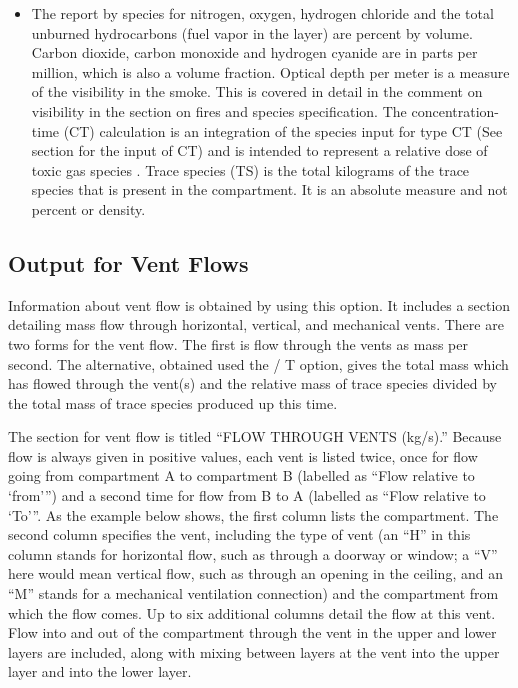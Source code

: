 \begin{itemize}
\item The report by species for nitrogen, oxygen, hydrogen chloride and the total unburned hydrocarbons (fuel vapor in the layer) are percent by volume. Carbon dioxide, carbon monoxide and hydrogen cyanide are in parts per million, which is also a volume fraction.  Optical depth per meter is a measure of the visibility in the smoke. This is covered in detail in the comment on visibility in the section on fires and species specification. The concentration-time (CT) calculation is an integration of the species input for type CT (See section  for the input of CT) and is intended to represent a relative dose of toxic gas species . Trace species (TS) is the total kilograms of the trace species that is present in the compartment. It is an absolute measure and not percent or density.
\end{itemize}

\subsection{Output for Vent Flows}

Information about vent flow is obtained by using this option.  It includes a section detailing mass flow through horizontal, vertical, and mechanical vents. There are two forms for the vent flow. The first is flow through the vents as mass per second. The alternative, obtained used the / T option, gives the total mass which has flowed through the vent(s) and the relative mass of trace species divided by the total mass of trace species produced up this time.

The section for vent flow is titled ``FLOW THROUGH VENTS (kg/s).''  Because flow is always given in positive values, each vent is listed twice, once for flow going from compartment A to compartment B (labelled as ``Flow relative to `from''') and a second time for flow from B to A (labelled as ``Flow relative to `To'''.  As the example below shows, the first column lists the compartment.  The second column specifies the vent, including the type of vent (an ``H'' in this column stands for horizontal flow, such as through a doorway or window; a ``V'' here would mean vertical flow, such as through an opening in the ceiling, and an ``M'' stands for a mechanical ventilation connection) and the compartment from which the flow comes. Up to six additional columns detail the flow at this vent. Flow into and out of the compartment through the vent in the upper and lower layers are included, along with mixing between layers at the vent into the upper layer and into the lower layer.

